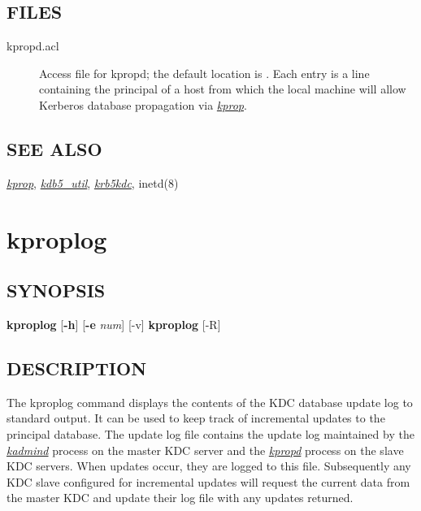 \documentclass[letterpaper,10pt,english]{sphinxmanual}
\begin{document}
\subsection{FILES}
\label{admin/admin_commands/kpropd:files}\begin{description}
\item[{kpropd.acl}] \leavevmode
Access file for kpropd; the default location is
.  Each entry is a line
containing the principal of a host from which the local machine
will allow Kerberos database propagation via {\hyperref[admin/admin_commands/kprop:kprop-8]{\emph{kprop}}}.

\end{description}


\subsection{SEE ALSO}
\label{admin/admin_commands/kpropd:see-also}
{\hyperref[admin/admin_commands/kprop:kprop-8]{\emph{kprop}}}, {\hyperref[admin/admin_commands/kdb5_util:kdb5-util-8]{\emph{kdb5\_util}}}, {\hyperref[admin/admin_commands/krb5kdc:krb5kdc-8]{\emph{krb5kdc}}}, inetd(8)


\section{kproplog}
\label{admin/admin_commands/kproplog:kproplog}\label{admin/admin_commands/kproplog:kproplog-8}\label{admin/admin_commands/kproplog::doc}

\subsection{SYNOPSIS}
\label{admin/admin_commands/kproplog:synopsis}
\textbf{kproplog} {[}\textbf{-h}{]} {[}\textbf{-e} \emph{num}{]} {[}-v{]}
\textbf{kproplog} {[}-R{]}


\subsection{DESCRIPTION}
\label{admin/admin_commands/kproplog:description}
The kproplog command displays the contents of the KDC database update
log to standard output.  It can be used to keep track of incremental
updates to the principal database.  The update log file contains the
update log maintained by the {\hyperref[admin/admin_commands/kadmind:kadmind-8]{\emph{kadmind}}} process on the master
KDC server and the {\hyperref[admin/admin_commands/kpropd:kpropd-8]{\emph{kpropd}}} process on the slave KDC servers.
When updates occur, they are logged to this file.  Subsequently any
KDC slave configured for incremental updates will request the current
data from the master KDC and update their log file with any updates
returned.
\end{document}
